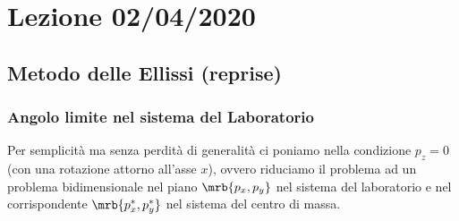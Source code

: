 \chapter{Lezione 02/04/2020}
\section{Metodo delle Ellissi (reprise)}
\subsection{Angolo limite nel sistema del Laboratorio}
Per semplicità ma senza perdità di generalità ci poniamo nella condizione $p_z
= 0$ (con una rotazione attorno all'asse $x$), ovvero riduciamo il problema ad
un problema bidimensionale nel piano $\mrb{p_x,p_y}$ nel sistema del
laboratorio e nel corrispondente $\mrb{p_x^*,p_y^*}$ nel sistema del centro di
massa.

